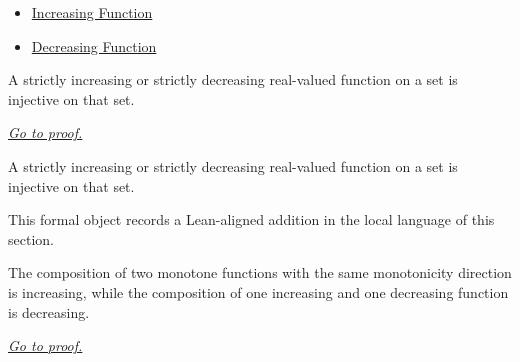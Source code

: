 \begin{dependencies}
\begin{itemize}
  \item \hyperref[def:function-increasing]{Increasing Function}
  \item \hyperref[def:function-decreasing]{Decreasing Function}
\end{itemize}
\end{dependencies}

\begin{theorem}
\label{thm:strictly-monotone-implies-injective}
A strictly increasing or strictly decreasing real-valued function on a set is injective on that set.

\smallskip
\noindent
\hyperref[prf:strictly-monotone-implies-injective]{\textit{Go to proof.}}
\end{theorem}

\begin{remark*}
A strictly increasing or strictly decreasing real-valued function on a set is injective on that set.
\end{remark*}

\begin{remark*}[Interpretation]
This formal object records a Lean-aligned addition in the local language of this section.
\end{remark*}

\begin{dependencies}
\NoLocalDependencies
\end{dependencies}
\begin{theorem}
\label{thm:composition-of-monotone-functions}
The composition of two monotone functions with the same monotonicity direction is increasing, while the composition of one increasing and one decreasing function is decreasing.

\smallskip
\noindent
\hyperref[prf:composition-of-monotone-functions]{\textit{Go to proof.}}
\end{theorem}

